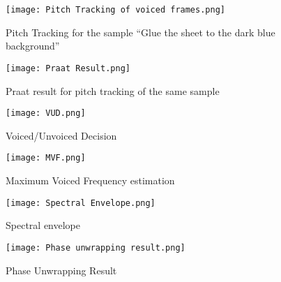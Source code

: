 \documentclass[BTech]{nitkdiss}
\begin{document}
\begin{figure}[H]
\centering
\texttt{[image: Pitch Tracking of voiced frames.png]}
\caption{Pitch Tracking for the sample ``Glue the sheet to the dark blue background''}
\end{figure}

\begin{figure}[H]
\centering
\texttt{[image: Praat Result.png]}
\caption{Praat result for pitch tracking of the same sample}
\end{figure}

\begin{figure}[H]
\centering
\texttt{[image: VUD.png]}
\caption{Voiced/Unvoiced Decision}
\end{figure}

\begin{figure}[H]
\centering
\texttt{[image: MVF.png]}
\caption{Maximum  Voiced Frequency estimation}
\end{figure}

\begin{figure}[H]
\centering
\texttt{[image: Spectral Envelope.png]}
\caption{Spectral envelope}
\end{figure}

\begin{figure}[H]
\centering
\texttt{[image: Phase unwrapping result.png]}
\caption{Phase Unwrapping Result}
\end{figure}
\end{document}
